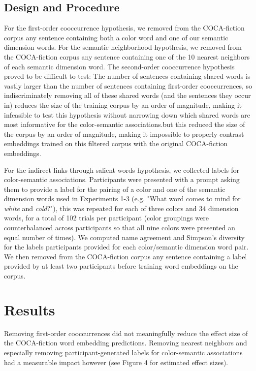 \documentclass[10pt,letterpaper]{article}
\begin{document}
\subsection{Design and Procedure}
For the first-order cooccurrence hypothesis, we removed from the COCA-fiction corpus any sentence containing both a color word and one of our semantic dimension words. For the semantic neighborhood hypothesis, we removed from the COCA-fiction corpus any sentence containing one of the 10 nearest neighbors of each semantic dimension word. The second-order cooccurrence hypothesis proved to be difficult to test: The number of sentences containing shared words is vastly larger than the number of sentences containing first-order cooccurrences, so indiscriminately removing all of these shared words (and the sentences they occur in) reduces the size of the training corpus by an order of magnitude, making it infeasible to test this hypothesis without narrowing down which shared words are most informative for the color-semantic associations.but this reduced the size of the corpus by an order of magnitude, making it impossible to properly contrast embeddings trained on this filtered corpus with the original COCA-fiction embeddings.

For the indirect links through salient words hypothesis, we collected labels for color-semantic associations. Participants were presented with a prompt asking them to provide a label for the pairing of a color and one of the semantic dimension words used in Experiments 1-3 (e.g. "What word comes to mind for \emph{white} and \emph{cold}?"), this was repeated for each of three colors and 34 dimension words, for a total of 102 trials per participant (color groupings were counterbalanced across participants so that all nine colors were presented an equal number of times). We computed name agreement and Simpson's diversity \cite{simpson1949measurement} for the labels participants provided for each color/semantic dimension word pair. We then removed from the COCA-fiction corpus any sentence containing a label provided by at least two participants before training word embeddings on the corpus.

\section{Results}
Removing first-order cooccurrences did not meaningfully reduce the effect size of the COCA-fiction word embedding predictions. Removing nearest neighbors and especially removing participant-generated labels for color-semantic associations had a measurable impact however (see Figure 4 for estimated effect sizes).
\end{document}
